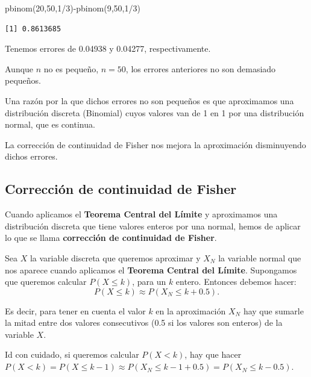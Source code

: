 \documentclass[
  letterpaper,
  DIV=11,
  numbers=noendperiod]{scrreprt}
\newenvironment{Shaded}{\begin{snugshade}}{\end{snugshade}}
\newcommand{\DecValTok}[1]{\textcolor[rgb]{0.68,0.00,0.00}{#1}}
\newcommand{\FunctionTok}[1]{\textcolor[rgb]{0.28,0.35,0.67}{#1}}
\newcommand{\NormalTok}[1]{\textcolor[rgb]{0.00,0.23,0.31}{#1}}
\newcommand{\SpecialCharTok}[1]{\textcolor[rgb]{0.37,0.37,0.37}{#1}}
\begin{document}
\begin{Shaded}
\begin{Highlighting}[]
\FunctionTok{pbinom}\NormalTok{(}\DecValTok{20}\NormalTok{,}\DecValTok{50}\NormalTok{,}\DecValTok{1}\SpecialCharTok{/}\DecValTok{3}\NormalTok{)}\SpecialCharTok{{-}}\FunctionTok{pbinom}\NormalTok{(}\DecValTok{9}\NormalTok{,}\DecValTok{50}\NormalTok{,}\DecValTok{1}\SpecialCharTok{/}\DecValTok{3}\NormalTok{)}
\end{Highlighting}
\end{Shaded}

\begin{verbatim}
[1] 0.8613685
\end{verbatim}

Tenemos errores de 0.04938 y 0.04277, respectivamente.

Aunque \(n\) no es pequeño, \(n=50\), los errores anteriores no son
demasiado pequeños.

Una razón por la que dichos errores no son pequeños es que aproximamos
una distribución discreta (Binomial) cuyos valores van de 1 en 1 por una
distribución normal, que es continua.

La corrección de continuidad de Fisher nos mejora la aproximación
disminuyendo dichos errores.

\hypertarget{correcciuxf3n-de-continuidad-de-fisher}{%
\subsection{Corrección de continuidad de
Fisher}\label{correcciuxf3n-de-continuidad-de-fisher}}

Cuando aplicamos el \textbf{Teorema Central del Límite} y aproximamos
una distribución discreta que tiene valores enteros por una normal,
hemos de aplicar lo que se llama \textbf{corrección de continuidad de
Fisher}.

Sea \(X\) la variable discreta que queremos aproximar y \(X_N\) la
variable normal que nos aparece cuando aplicamos el \textbf{Teorema
Central del Límite}. Supongamos que queremos calcular \(P(X\leq k)\),
para un \(k\) entero. Entonces debemos hacer: \[
P(X\leq k)\approx P(X_N\leq k+0.5).
\]

Es decir, para tener en cuenta el valor \(k\) en la aproximación \(X_N\)
hay que sumarle la mitad entre dos valores consecutivos (0.5 si los
valores son enteros) de la variable \(X\).

Id con cuidado, si queremos calcular \(P(X<k)\), hay que hacer
\(P(X<k) =P(X\leq k-1)\approx P(X_N \leq k-1+0.5)=P(X_N\leq k-0.5)\).
\end{document}
